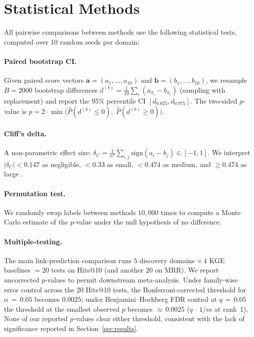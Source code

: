 \section{Statistical Methods}\label{sec:stat-methods}

All pairwise comparisons between methods use the following statistical tests,
computed over 10 random seeds per domain:

\paragraph{Paired bootstrap CI.}
Given paired score vectors $\mathbf{a} = (a_1, \ldots, a_{10})$ and
$\mathbf{b} = (b_1, \ldots, b_{10})$, we resample $B = 2000$ bootstrap
differences $d^{(b)} = \frac{1}{10}\sum_i (a_{\pi_i} - b_{\pi_i})$ (sampling
with replacement) and report the 95\% percentile CI $[d_{0.025}, d_{0.975}]$.
The two-sided $p$-value is $p = 2 \cdot \min\!\bigl(\hat{P}(d^{(b)} \leq 0),\;
\hat{P}(d^{(b)} \geq 0)\bigr)$.

\paragraph{Cliff's delta.}
A non-parametric effect size: $\delta_C = \frac{1}{n^2}\sum_{i,j}
\text{sign}(a_i - b_j) \in [-1, 1]$.  We interpret $|\delta_C| < 0.147$ as
negligible, $< 0.33$ as small, $< 0.474$ as medium, and $\geq 0.474$ as large
\citep{cliff1993dominance}.

\paragraph{Permutation test.}
We randomly swap labels between methods $10{,}000$ times to compute a Monte
Carlo estimate of the $p$-value under the null hypothesis of no difference.

\paragraph{Multiple-testing.}
The main link-prediction comparison runs $5$ discovery domains
$\times\,4$ KGE baselines $=20$ tests on Hits@10 (and another $20$ on
MRR).  We report uncorrected $p$-values to permit downstream
meta-analysis.  Under family-wise error control across the $20$
Hits@10 tests, the Bonferroni-corrected threshold for $\alpha\,=\,0.05$
becomes $0.0025$; under Benjamini--Hochberg FDR control at $q\,=\,0.05$
the threshold at the smallest observed $p$ becomes ${\approx}\,0.0025$
($q\,\cdot\,1/m$ at rank~1).
None of our reported $p$-values clear either threshold, consistent with
the lack of significance reported in Section~\ref{sec:results}.

